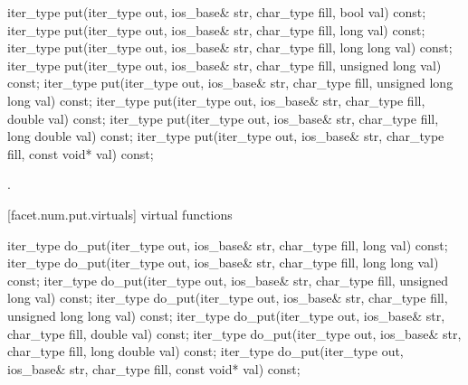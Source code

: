 %
%
\begin{itemdecl}
iter_type put(iter_type out, ios_base& str, char_type fill,
  bool val) const;
iter_type put(iter_type out, ios_base& str, char_type fill,
  long val) const;
iter_type put(iter_type out, ios_base& str, char_type fill,
  long long val) const;
iter_type put(iter_type out, ios_base& str, char_type fill,
  unsigned long val) const;
iter_type put(iter_type out, ios_base& str, char_type fill,
  unsigned long long val) const;
iter_type put(iter_type out, ios_base& str, char_type fill,
  double val) const;
iter_type put(iter_type out, ios_base& str, char_type fill,
  long double val) const;
iter_type put(iter_type out, ios_base& str, char_type fill,
  const void* val) const;
\end{itemdecl}

\begin{itemdescr}
\pnum
\returns
{}.
\end{itemdescr}

[facet.num.put.virtuals]{ virtual functions}

%
%
\begin{itemdecl}
iter_type do_put(iter_type out, ios_base& str, char_type fill,
  long val) const;
iter_type do_put(iter_type out, ios_base& str, char_type fill,
  long long val) const;
iter_type do_put(iter_type out, ios_base& str, char_type fill,
  unsigned long val) const;
iter_type do_put(iter_type out, ios_base& str, char_type fill,
  unsigned long long val) const;
iter_type do_put(iter_type out, ios_base& str, char_type fill,
  double val) const;
iter_type do_put(iter_type out, ios_base& str, char_type fill,
  long double val) const;
iter_type do_put(iter_type out, ios_base& str, char_type fill,
  const void* val) const;
\end{itemdecl}

